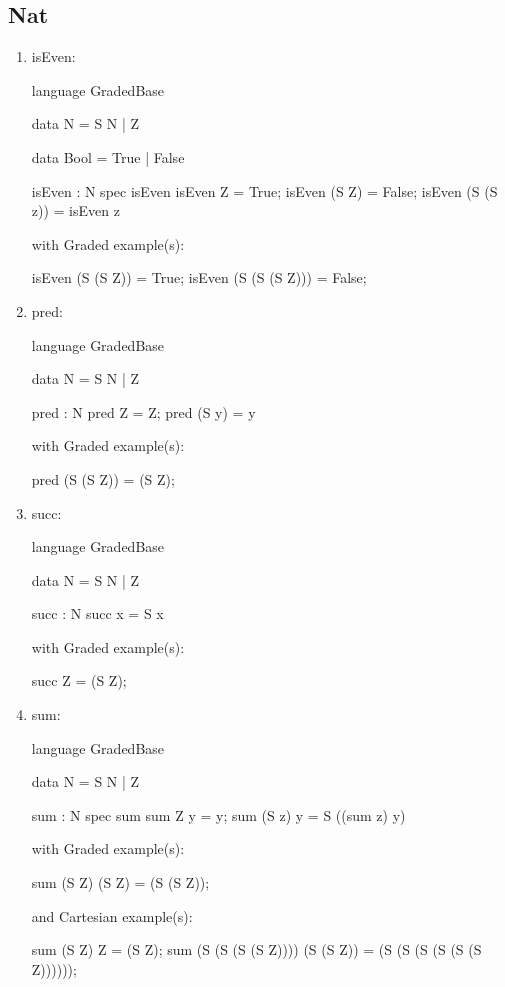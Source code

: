 \subsection{Nat}
\begin{enumerate}
\item isEven: 
\begin{granule}
language GradedBase 

data N = S N | Z

data Bool = True | False

isEven : N %
spec 
    isEven %
isEven Z = True;
isEven (S Z) = False;
isEven (S (S z)) = isEven z
\end{granule}
with Graded example(s):
\begin{granule}
isEven (S (S Z)) = True;
isEven (S (S (S Z))) = False;
\end{granule}
\item pred: 
\begin{granule}
language GradedBase 

data N = S N | Z

pred : N %
pred Z = Z;
pred (S y) = y
\end{granule}
with Graded example(s):
\begin{granule}
pred (S (S Z)) = (S Z);
\end{granule}
\item succ: 
\begin{granule}
language GradedBase 

data N = S N | Z

succ : N %
succ x = S x
\end{granule}
with Graded example(s):
\begin{granule}
succ Z = (S Z);
\end{granule}
\item sum: 
\begin{granule}
language GradedBase 

data N = S N | Z

sum : N %
spec 
    sum %
sum Z y = y;
sum (S z) y = S ((sum z) y)
\end{granule}
with Graded example(s):
\begin{granule}
sum (S Z) (S Z) = (S (S Z));
\end{granule}
and Cartesian example(s):
\begin{granule}
sum (S Z) Z = (S Z); 
sum (S (S (S (S Z)))) (S (S Z)) = (S (S (S (S (S (S Z))))));
\end{granule}
\end{enumerate}
